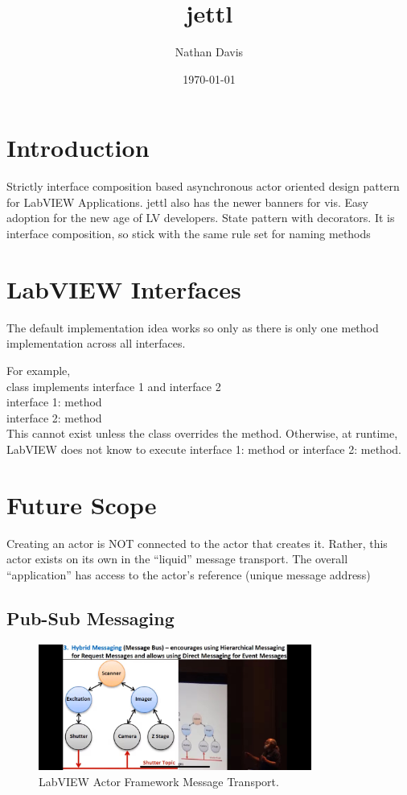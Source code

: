 \documentclass{article}
\title{jettl}
\author{Nathan Davis}
\date{\today}
\begin{document}
\section{Introduction}
\label{sec:introduction}

Strictly interface composition based asynchronous actor oriented design pattern for LabVIEW Applications.
jettl also has the newer banners for vis. Easy adoption for the new age of LV developers.
State pattern with decorators.
It is interface composition, so stick with the same rule set for naming methods

\section{LabVIEW Interfaces}
\label{sec:labview-interfaces}

The default implementation idea works so only as there is only one method implementation across all interfaces.

For example, \\
class implements interface 1 and interface 2 \\
interface 1: method \\
interface 2: method \\
This cannot exist unless the class overrides the method.
Otherwise, at runtime, LabVIEW does not know to execute interface 1: method or interface 2: method.

\section{Future Scope}
\label{sec:future-scope}

Creating an actor is NOT connected to the actor that creates it.
Rather, this actor exists on its own in the “liquid” message transport.
The overall “application” has access to the actor's reference (unique message address)

\subsection{Pub-Sub Messaging}
\label{subsec:pub-sub-messaging}

\begin{figure}[h]
    \centering
    \includegraphics[width=0.8\textwidth]{figures/labview_dmitry_message _transport}
    \caption{LabVIEW Actor Framework Message Transport.}
    \label{fig:message-transport}
\end{figure}
\end{document}
